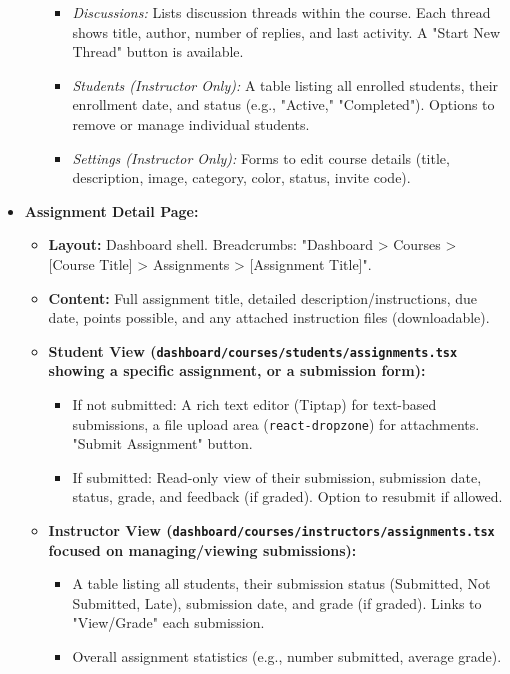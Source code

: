 \documentclass[12pt,a4paper]{article}
\begin{document}
\begin{itemize}
\begin{itemize}
\begin{itemize}
            \item \textit{Discussions:} Lists discussion threads within the course. Each thread shows title, author, number of replies, and last activity. A "Start New Thread" button is available.
            \item \textit{Students (Instructor Only):} A table listing all enrolled students, their enrollment date, and status (e.g., "Active," "Completed"). Options to remove or manage individual students.
            \item \textit{Settings (Instructor Only):} Forms to edit course details (title, description, image, category, color, status, invite code).
        \end{itemize}
    \end{itemize}
    \item \textbf{Assignment Detail Page:}
    \begin{itemize}
        \item \textbf{Layout:} Dashboard shell. Breadcrumbs: "Dashboard > Courses > [Course Title] > Assignments > [Assignment Title]".
        \item \textbf{Content:} Full assignment title, detailed description/instructions, due date, points possible, and any attached instruction files (downloadable).
        \item \textbf{Student View (\texttt{dashboard/courses/students/assignments.tsx} showing a specific assignment, or a submission form):}
        \begin{itemize}
            \item If not submitted: A rich text editor (Tiptap) for text-based submissions, a file upload area (\texttt{react-dropzone}) for attachments. "Submit Assignment" button.
            \item If submitted: Read-only view of their submission, submission date, status, grade, and feedback (if graded). Option to resubmit if allowed.
        \end{itemize}
        \item \textbf{Instructor View (\texttt{dashboard/courses/instructors/assignments.tsx} focused on managing/viewing submissions):}
        \begin{itemize}
            \item A table listing all students, their submission status (Submitted, Not Submitted, Late), submission date, and grade (if graded). Links to "View/Grade" each submission.
            \item Overall assignment statistics (e.g., number submitted, average grade).

\end{itemize}
\end{itemize}
\end{itemize}
\end{document}
